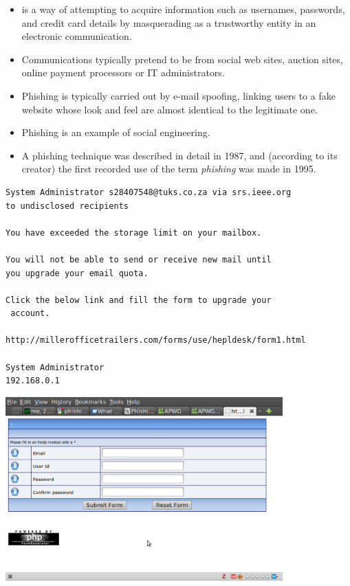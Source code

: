 \documentclass[a4paper,landscape,headrule,footrule,xetex]{foils}
\begin{document}
\begin{itemize}
\item {} is a way of attempting to acquire information
  such as usernames, passwords, and credit card details by
  masquerading as a trustworthy entity in an electronic communication.
\item Communications typically pretend to be from social web sites, auction sites, online payment processors or IT administrators.
\item Phishing is typically carried out by e-mail spoofing, linking
  users to a fake website whose look and feel are almost identical
  to the legitimate one.
\item Phishing is an example of social engineering.
\item A phishing technique was described in detail in 1987, and (according to its creator) the first recorded use of the term \textit{phishing} was made in 1995.
\end{itemize}

\MyLogo{}
\begin{verbatim}
System Administrator s28407548@tuks.co.za via srs.ieee.org 
to undisclosed recipients

You have exceeded the storage limit on your mailbox.

You will not be able to send or receive new mail until 
you upgrade your email quota.

Click the below link and fill the form to upgrade your
 account.

http://millerofficetrailers.com/forms/use/hepldesk/form1.html

System Administrator
192.168.0.1
\end{verbatim}

\begin{center}
  \includegraphics[width=0.8\textwidth]{../pics/phishing.eps}
\end{center}
\end{document}
